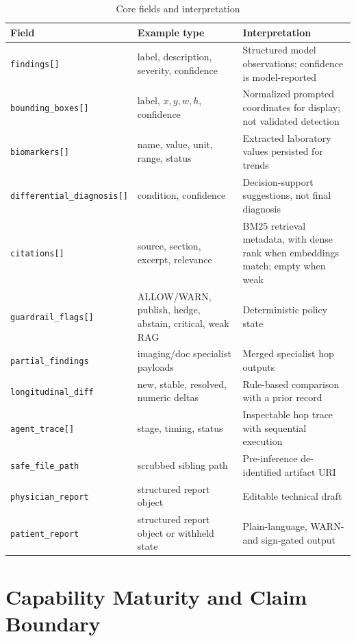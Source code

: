 \documentclass[conference]{IEEEtran}
\begin{document}
\begin{table}[t]
\caption{Core fields and interpretation}
\label{tab:schema}
\centering
\scriptsize
\begin{tabular}{p{}p{}p{}}
\toprule
Field & Example type & Interpretation \\
\midrule
\texttt{findings[]} & label, description, severity, confidence & Structured model observations; confidence is model-reported \\
\texttt{bounding\_boxes[]} & label, \(x,y,w,h\), confidence & Normalized prompted coordinates for display; not validated detection \\
\texttt{biomarkers[]} & name, value, unit, range, status & Extracted laboratory values persisted for trends \\
\texttt{differential\_diagnosis[]} & condition, confidence & Decision-support suggestions, not final diagnosis \\
\texttt{citations[]} & source, section, excerpt, relevance & BM25 retrieval metadata, with dense rank when embeddings match; empty when weak \\
\texttt{guardrail\_flags[]} & ALLOW/WARN, publish, hedge, abstain, critical, weak RAG & Deterministic policy state \\
\texttt{partial\_findings} & imaging/doc specialist payloads & Merged specialist hop outputs \\
\texttt{longitudinal\_diff} & new, stable, resolved, numeric deltas & Rule-based comparison with a prior record \\
\texttt{agent\_trace[]} & stage, timing, status & Inspectable hop trace with sequential execution \\
\texttt{safe\_file\_path} & scrubbed sibling path & Pre-inference de-identified artifact URI \\
\texttt{physician\_report} & structured report object & Editable technical draft \\
\texttt{patient\_report} & structured report object or withheld state & Plain-language, WARN- and sign-gated output \\
\bottomrule
\end{tabular}
\end{table}

\section{Capability Maturity and Claim Boundary}
\end{document}
